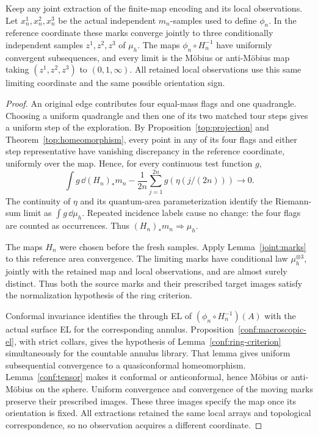 \begin{theorem}
\label{conf:canonical}
Keep any joint extraction of the finite-map encoding and its local
observations.  Let \(x_n^1,x_n^2,x_n^3\) be the actual independent
\(m_n\)-samples used to define \(\phi_n\).  In the reference
coordinate these marks converge jointly to three conditionally
independent samples \(z^1,z^2,z^3\) of \(\mu_h\).  The maps
\(\phi_n\circ H_n^{-1}\) have uniformly convergent subsequences,
and every limit is the M\"obius or anti-M\"obius map taking
\((z^1,z^2,z^3)\) to \((0,1,\infty)\).  All retained local
observations use this same limiting coordinate and the same possible
orientation sign.
\end{theorem}

\begin{proof}
An original edge contributes four equal-mass flags and one
quadrangle.  Choosing a uniform quadrangle and then one of its
two matched tour steps gives a uniform step of the exploration.
By Proposition~\ref{top:projection} and Theorem~\ref{top:homeomorphism},
every point in any of its four
flags and either step representative have vanishing discrepancy
in the reference coordinate, uniformly over the map.  Hence, for
every continuous test function \(g\),
\[
 \int g\,\dd (H_n)_*m_n
       -\frac1{2n}\sum_{j=1}^{2n}g(\eta(j/(2n)))
       \longrightarrow0.
\]
The continuity of \(\eta\) and its quantum-area parameterization
identify the Riemann-sum limit as \(\int g\,\dd\mu_h\).
Repeated incidence labels cause no change: the four flags are
counted as occurrences.  Thus \((H_n)_*m_n\Rightarrow\mu_h\).

The maps \(H_n\) were chosen before the fresh samples.  Apply
Lemma~\ref{joint:marks} to this reference area convergence.  The
limiting marks have conditional law \(\mu_h^{\otimes3}\), jointly
with the retained map and local observations, and are almost surely
distinct.  Thus both the source marks and their prescribed target
images satisfy the normalization hypothesis of the ring criterion.

Conformal invariance identifies the through EL of
\((\phi_n\circ H_n^{-1})(A)\) with the actual surface EL for
the corresponding annulus.  Proposition~\ref{conf:macroscopic-el},
with strict collars, gives the hypothesis of
Lemma~\ref{conf:ring-criterion} simultaneously for the countable
annulus library.  That lemma gives uniform subsequential
convergence to a quasiconformal homeomorphism.  Lemma~\ref{conf:tensor}
makes it conformal or anticonformal, hence M\"obius or
anti-M\"obius on the sphere.  Uniform convergence and convergence
of the moving marks preserve their prescribed images.  These
three images specify the map once its orientation is fixed.
All extractions retained the same local arrays and topological
correspondence, so no observation acquires a different coordinate.
\end{proof}

